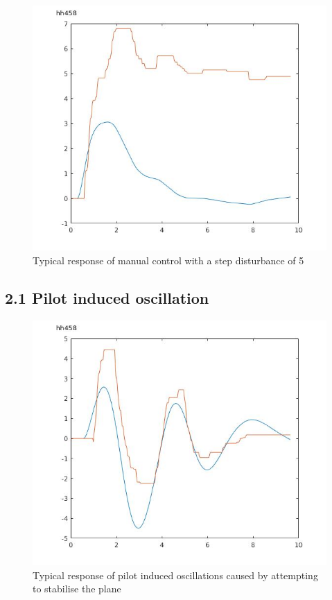 \documentclass[twoside,twocolumn]{article}
\begin{document}
\begin{figure}[h]
  \centering
    \includegraphics[width=\linewidth]{2_step}
  \caption{Typical response of manual control with a step disturbance of 5 }
  \label{fig:2step}
\end{figure}
\subsection{2.1 Pilot induced oscillation}
 \begin{figure}[h]
  \centering
    \includegraphics[width=\linewidth]{2-1_with_input}
  \caption{Typical response of pilot induced oscillations caused by attempting to stabilise the plane}
  \label{fig:2-1pio}
\end{figure}
\end{document}
